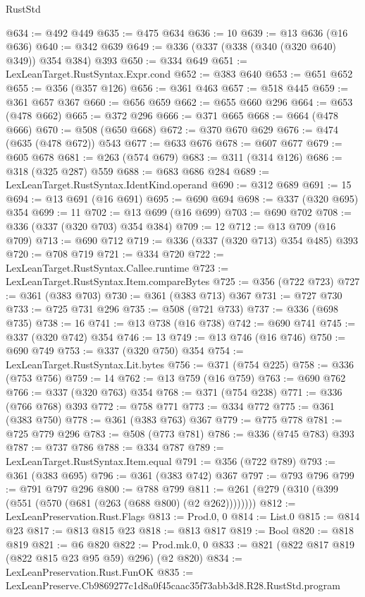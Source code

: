 \begin{lexlean}{RustStd}
\begin{coremodule}
@634 := @492 @449
@635 := @475 @634
@636 := 10
@639 := @13 @636 (@16 @636)
@640 := @342 @639
@649 := @336 (@337 (@338 (@340 (@320 @640) @349)) @354 @384) @393
@650 := @334 @649
@651 := LexLeanTarget.RustSyntax.Expr.cond
@652 := @383 @640
@653 := @651 @652
@655 := @356 (@357 @126)
@656 := @361 @463
@657 := @518 @445
@659 := @361 @657 @367
@660 := @656 @659
@662 := @655 @660 @296
@664 := @653 (@478 @662)
@665 := @372 @296
@666 := @371 @665
@668 := @664 (@478 @666)
@670 := @508 (@650 @668)
@672 := @370 @670 @629
@676 := @474 (@635 (@478 @672)) @543
@677 := @633 @676
@678 := @607 @677
@679 := @605 @678
@681 := @263 (@574 @679)
@683 := @311 (@314 @126)
@686 := @318 (@325 @287) @559
@688 := @683 @686 @284
@689 := LexLeanTarget.RustSyntax.IdentKind.operand
@690 := @312 @689
@691 := 15
@694 := @13 @691 (@16 @691)
@695 := @690 @694
@698 := @337 (@320 @695) @354
@699 := 11
@702 := @13 @699 (@16 @699)
@703 := @690 @702
@708 := @336 (@337 (@320 @703) @354 @384)
@709 := 12
@712 := @13 @709 (@16 @709)
@713 := @690 @712
@719 := @336 (@337 (@320 @713) @354 @485) @393
@720 := @708 @719
@721 := @334 @720
@722 := LexLeanTarget.RustSyntax.Callee.runtime
@723 := LexLeanTarget.RustSyntax.Item.compareBytes
@725 := @356 (@722 @723)
@727 := @361 (@383 @703)
@730 := @361 (@383 @713) @367
@731 := @727 @730
@733 := @725 @731 @296
@735 := @508 (@721 @733)
@737 := @336 (@698 @735)
@738 := 16
@741 := @13 @738 (@16 @738)
@742 := @690 @741
@745 := @337 (@320 @742) @354
@746 := 13
@749 := @13 @746 (@16 @746)
@750 := @690 @749
@753 := @337 (@320 @750) @354
@754 := LexLeanTarget.RustSyntax.Lit.bytes
@756 := @371 (@754 @225)
@758 := @336 (@753 @756)
@759 := 14
@762 := @13 @759 (@16 @759)
@763 := @690 @762
@766 := @337 (@320 @763) @354
@768 := @371 (@754 @238)
@771 := @336 (@766 @768) @393
@772 := @758 @771
@773 := @334 @772
@775 := @361 (@383 @750)
@778 := @361 (@383 @763) @367
@779 := @775 @778
@781 := @725 @779 @296
@783 := @508 (@773 @781)
@786 := @336 (@745 @783) @393
@787 := @737 @786
@788 := @334 @787
@789 := LexLeanTarget.RustSyntax.Item.equal
@791 := @356 (@722 @789)
@793 := @361 (@383 @695)
@796 := @361 (@383 @742) @367
@797 := @793 @796
@799 := @791 @797 @296
@800 := @788 @799
@811 := @261 (@279 (@310 (@399 (@551 (@570 (@681 (@263 (@688 @800) (@2 @262))))))))
@812 := LexLeanPreservation.Rust.Flags
@813 := Prod.{0, 0}
@814 := List.{0}
@815 := @814 @23
@817 := @813 @815 @23
@818 := @813 @817
@819 := Bool
@820 := @818 @819
@821 := @6 @820
@822 := Prod.mk.{0, 0}
@833 := @821 (@822 @817 @819 (@822 @815 @23 @95 @59) @296) (@2 @820)
@834 := LexLeanPreservation.Rust.FunOK
@835 := LexLeanPreserve.Cb9869277c1d8a0f45caac35f73abb3d8.R28.RustStd.program

\end{coremodule}
\end{lexlean}
